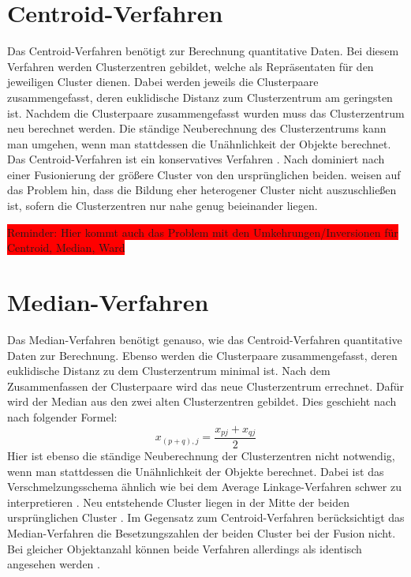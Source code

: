 \section{Centroid-Verfahren}
Das Centroid-Verfahren benötigt zur Berechnung quantitative Daten. Bei diesem Verfahren werden Clusterzentren gebildet, welche als Repräsentaten für den jeweiligen Cluster dienen. Dabei werden jeweils die Clusterpaare zusammengefasst, deren euklidische Distanz zum Clusterzentrum am geringsten ist. Nachdem die Clusterpaare zusammengefasst wurden muss das Clusterzentrum neu berechnet werden. Die ständige Neuberechnung des Clusterzentrums kann man umgehen, wenn man stattdessen die Unähnlichkeit der Objekte berechnet. Das Centroid-Verfahren ist ein konservatives Verfahren \citep[Vgl.][S. 285-289]{Bacher.2010}. Nach \citet[S. 79]{Everitt.2011} dominiert nach einer Fusionierung der größere Cluster von den ursprünglichen beiden.
\citet[S. 243]{Eckey.2002} weisen auf das Problem hin, dass die Bildung eher heterogener Cluster nicht auszuschließen ist, sofern die Clusterzentren nur nahe genug beieinander liegen.

\colorbox{red}{Reminder: Hier kommt auch das Problem mit den Umkehrungen/Inversionen für Centroid, Median, Ward}

\section{Median-Verfahren}
Das Median-Verfahren benötigt genauso, wie das Centroid-Verfahren quantitative Daten zur Berechnung. Ebenso werden die Clusterpaare zusammengefasst, deren euklidische Distanz zu dem Clusterzentrum minimal ist. Nach dem Zusammenfassen der Clusterpaare wird das neue Clusterzentrum errechnet. Dafür wird der Median aus den zwei alten Clusterzentren gebildet. Dies geschieht nach \citet[S. 286]{Bacher.2010} nach folgender Formel:
\begin{equation}
	x_{(p+q),j} = \frac{x_{pj} + x_{qj}}{2}
\end{equation}
Hier ist ebenso die ständige Neuberechnung der Clusterzentren nicht notwendig, wenn man stattdessen die Unähnlichkeit der Objekte berechnet. Dabei ist das Verschmelzungsschema ähnlich wie bei dem Average Linkage-Verfahren schwer zu interpretieren \citep[Vgl.][S. 285-289]{Bacher.2010}. Neu entstehende Cluster liegen in der Mitte der beiden ursprünglichen Cluster \citep[Vgl.][S. 79]{Everitt.2011}.
Im Gegensatz zum Centroid-Verfahren berücksichtigt das Median-Verfahren die Besetzungszahlen der beiden Cluster bei der Fusion nicht. Bei gleicher Objektanzahl können beide Verfahren allerdings als identisch angesehen werden \citep[Vgl.][S. 242]{Eckey.2002}.

